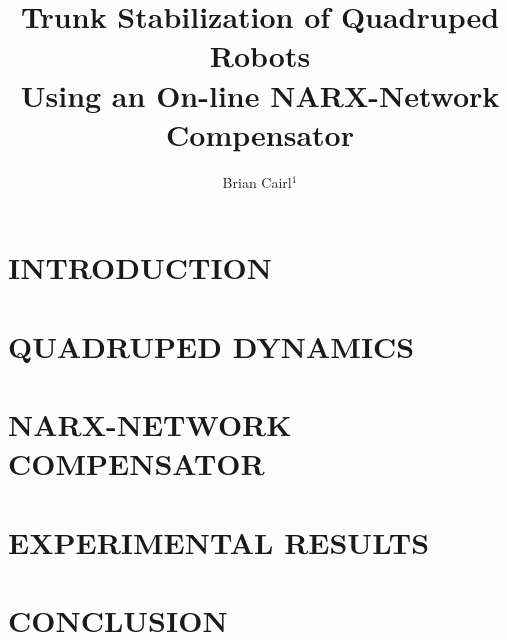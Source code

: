\documentclass[letterpaper, 10 pt, conference]{ieeeconf}  %
\title{\LARGE \bf
Trunk Stabilization of Quadruped Robots \\
Using an On-line NARX-Network Compensator
}
\author{Brian Cairl$^{1}$}
\begin{document}
\maketitle
\thispagestyle{empty}
\pagestyle{empty}


\begin{abstract}



\end{abstract}


\section{INTRODUCTION}



\section{QUADRUPED DYNAMICS}



\section{NARX-NETWORK COMPENSATOR}




\section{EXPERIMENTAL RESULTS}




\section{CONCLUSION}











\end{document}
